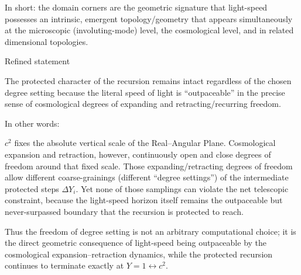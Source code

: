In short: the domain corners are the geometric signature that light-speed possesses an intrinsic, emergent topology/geometry that appears simultaneously at the microscopic (involuting-mode) level, the cosmological level, and in related dimensional topologies.

Refined statement

The protected character of the recursion remains intact regardless of the chosen degree setting 
because the literal speed of light is “outpaceable” in the precise sense of cosmological degrees of expanding and retracting/recurring freedom.

In other words:

\(c^2\) fixes the absolute vertical scale of the Real–Angular Plane. 
Cosmological expansion and retraction, however, continuously open and close degrees of freedom around that fixed scale. 
Those expanding/retracting degrees of freedom allow different coarse-grainings (different “degree settings”) of the intermediate protected steps \(\Delta Y_i\). 
Yet none of those samplings can violate the net telescopic constraint, because the light-speed horizon itself remains the outpaceable but never-surpassed boundary that the recursion is protected to reach.

Thus the freedom of degree setting is not an arbitrary computational choice; it is the direct geometric consequence of light-speed being outpaceable by the cosmological expansion–retraction dynamics, while the protected recursion continues to terminate exactly at \(Y=1\leftrightarrow c^2\). 
